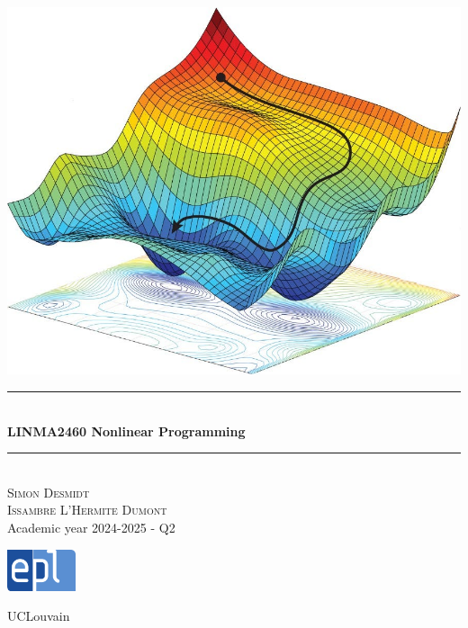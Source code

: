 \documentclass[12pt, openany]{report}
\newcommand{\HRule}{\rule{\linewidth}{0.5mm}}
\theoremstyle{definition}
\begin{document}
\begin{titlepage}
    \begin{sffamily}
    \begin{center}
        \includegraphics[scale=0.3]{img/page_de_garde.png} \\[1cm]
        \HRule \\[0.4cm]
        { \huge \bfseries LINMA2460 Nonlinear Programming \\[0.4cm] }
    
        \HRule \\[1.5cm]
        \textsc{\LARGE Simon Desmidt\\ Issambre L'Hermite Dumont}\\[1cm]
        \vfill
        \vspace{2cm}
        {\large Academic year 2024-2025 - Q2}
        \vspace{0.4cm}
         
        \includegraphics[width=0.15\textwidth]{img/epl.png}
        
        UCLouvain\\
    
    \end{center}
    \end{sffamily}
\end{titlepage}

\setcounter{tocdepth}{1}
\tableofcontents
\end{document}

